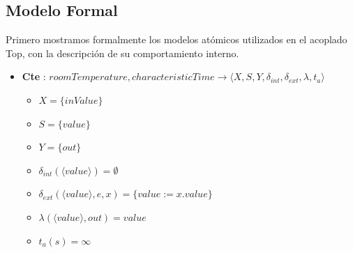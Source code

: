 \subsection{Modelo Formal}
Primero mostramos formalmente los modelos atómicos utilizados en el acoplado Top, con la descripción de su comportamiento interno.
\begin{itemize}

\item \textbf{Cte} : $ roomTemperature, characteristicTime \rightarrow \langle X, S, Y, \delta_{int}, \delta_{ext}, \lambda, t_{a} \rangle$ \newline
\begin{itemize}
	\item $ X = \{ inValue \} $ \newline
	\item $ S = \{ value \} $ \newline
	\item $ Y = \{ out \} $ \newline
	\item $ \delta_{int}(\langle value \rangle) = \emptyset $ \newline
	\item $ \delta_{ext} (\langle value \rangle, e, x)= \{ value := x.value \} $ \newline
	\item $ \lambda(\langle value \rangle, out) = value $ \newline
	\item $ t_{a}(s) = \infty $ 
\end{itemize}


\end{itemize}
